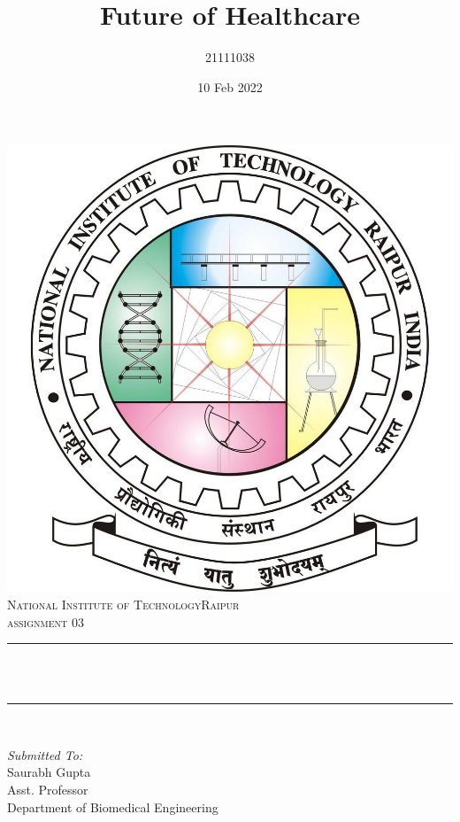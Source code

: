 \documentclass[12pt]{article}
\title{Future of Healthcare}								%
\author{21111038}								%
\date{10 Feb 2022}											%
\makeatletter
\let\thetitle\@title
\makeatother
\begin{document}

\begin{titlepage}
	\centering
    \vspace*{0.5 cm}
    \includegraphics[scale = 0.20]{logo.jpg}\\[1.0 cm]	%
    \textsc{\LARGE  National Institute of Technology\newline\newline Raipur}\\[2.0 cm]	%
	\textsc{\Large assignment 03}\\[0.5 cm]				%
	\rule{\linewidth}{0.2 mm} \\[0.4 cm]
	{ \huge \bfseries \thetitle}\\
	\rule{\linewidth}{0.2 mm} \\[1.5 cm]
	
	\begin{minipage}{0.4\textwidth}
		\begin{flushleft} \large
			\emph{Submitted To:}\\
			Saurabh Gupta\\
            Asst. Professor\\
            Department of Biomedical Engineering\\
			\end{flushleft}
			\end{minipage}~
			\begin{minipage}{0.4\textwidth}
            

\end{minipage}
\end{titlepage}
\end{document}
